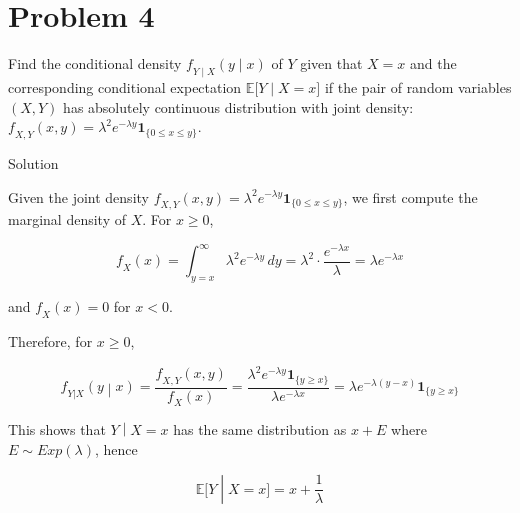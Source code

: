 \section{Problem 4}\label{hw03-problem-4}

Find the conditional density \(\mathit{f}_{\mathit{Y} \mid \mathit{X}}(\mathit{y} \mid \mathit{x})\) of \(\mathit{Y}\) given that \(\mathit{X} = \mathit{x}\) and the corresponding conditional expectation \(\mathbb{E}\lbrack\mathit{Y} \mid \mathit{X} = \mathit{x}\rbrack\) if the pair of random variables \((\mathit{X},\mathit{Y})\) has absolutely continuous distribution with joint density: \(\mathit{f}_{\mathit{X},\mathit{Y}}(\mathit{x},\mathit{y}) = \mathit{\lambda}^{2}\mathit{e}^{- \mathit{\lambda}\mathit{y}}\mathbf{1}_{\{{0 \leq \mathit{x} \leq \mathit{y}}\}}\).

\begin{qlsolution}{Solution}

Given the joint density \(\mathit{f}_{\mathit{X},\mathit{Y}}(\mathit{x},\mathit{y}) = \mathit{\lambda}^{2}\mathit{e}^{- \mathit{\lambda}\mathit{y}}\mathbf{1}_{\{{0 \leq \mathit{x} \leq \mathit{y}}\}}\), we first compute the marginal density of \(\mathit{X}\). For \(\mathit{x} \geq 0\),

\[\mathit{f}_{\mathit{X}}(\mathit{x}) = \int_{\mathit{y} = \mathit{x}}^{\infty}\mathit{\lambda}^{2}\mathit{e}^{- \mathit{\lambda}\mathit{y}}\,\mathit{d}\mathit{y} = \mathit{\lambda}^{2} \cdot \frac{\mathit{e}^{- \mathit{\lambda}\mathit{x}}}{\mathit{\lambda}} = \mathit{\lambda}\mathit{e}^{- \mathit{\lambda}\mathit{x}}\]

and \(\mathit{f}_{\mathit{X}}(\mathit{x}) = 0\) for \(\mathit{x} < 0\).

Therefore, for \(\mathit{x} \geq 0\),

\[\left. \mathit{f}_{\mathit{Y}|\mathit{X}}(\mathit{y} \middle| \mathit{x}) = \frac{\mathit{f}_{\mathit{X},\mathit{Y}}(\mathit{x},\mathit{y})}{\mathit{f}_{\mathit{X}}(\mathit{x})} = \frac{\mathit{\lambda}^{2}\mathit{e}^{- \mathit{\lambda}\mathit{y}}\mathbf{1}_{\{{\mathit{y} \geq \mathit{x}}\}}}{\mathit{\lambda}\mathit{e}^{- \mathit{\lambda}\mathit{x}}} = \mathit{\lambda}\mathit{e}^{- \mathit{\lambda}(\mathit{y} - \mathit{x})}\mathbf{1}_{\{{\mathit{y} \geq \mathit{x}}\}} \right.\]

This shows that \(\left. \mathit{Y} \middle| \mathit{X} = \mathit{x} \right.\) has the same distribution as \(\mathit{x} + \mathit{E}\) where \(\mathit{E} \sim Exp(\mathit{\lambda})\), hence

\[\left. \mathbb{E}\lbrack\mathit{Y} \middle| \mathit{X} = \mathit{x}\rbrack = \mathit{x} + \frac{1}{\mathit{\lambda}} \right.\]

\end{qlsolution}

